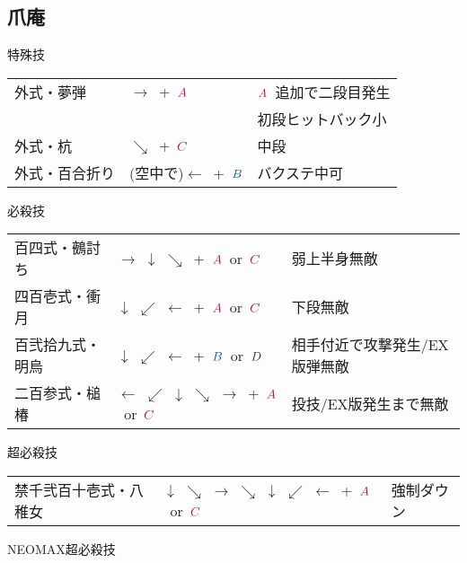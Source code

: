 \documentclass[a4j,11pt]{jarticle}
\def\A{$\textcolor{Acolor}{A}$}
\def\C{$\textcolor{Ccolor}{C}$}
\def\B{$\textcolor{Bcolor}{B}$}
\def\D{$\textcolor{Dcolor}{D}$}
\def\hado{$\downarrow$ $\searrow$ $\rightarrow$}%
\def\tatsu{$\downarrow$ $\swarrow$ $\leftarrow$}%
\def\syoryu{$\rightarrow$ $\downarrow$ $\searrow$}%
\def\yoga{$\leftarrow$ $\swarrow$ $\downarrow$ $\searrow$ $\rightarrow$}%
\def\ryuko{$\downarrow$ $\searrow$ $\rightarrow$ $\searrow$ $\downarrow$ $\swarrow$ $\leftarrow$}%
\begin{document}
\subsection{爪庵}
\begin{itembox}[l]{特殊技}
\begin{tabular}{lll}
外式・夢弾&$\rightarrow$\ +\ \A&\A\ 追加で二段目発生\\
&&初段ヒットバック小\\%
外式・杭&$\searrow$\ +\ \C&中段\\%
外式・百合折り&(空中で)$\leftarrow$\ +\ \B&バクステ中可%
\end{tabular}
\end{itembox}
\begin{itembox}[l]{必殺技}
\begin{tabular}{lll}
百四式・鵺討ち&\syoryu\ +\ \A\ or\ \C&弱上半身無敵\\%
四百壱式・衝月&\tatsu\ +\ \A\ or\ \C&下段無敵\\ %
百弐拾九式・明烏&\tatsu\ +\ \B\ or\ \D&相手付近で攻撃発生/EX版弾無敵\\ %
二百参式・槌椿&\yoga\ +\ \A\ or\ \C&投技/EX版発生まで無敵%
\end{tabular}
\end{itembox}
\begin{itembox}[l]{超必殺技}
\begin{tabular}{lll}
禁千弐百十壱式・八稚女&\ryuko\ +\ \A\ or\ \C&強制ダウン\\ %
\end{tabular}
\end{itembox}
\begin{itembox}[l]{NEOMAX超必殺技}
\end{itembox}
\newpage
\end{document}
